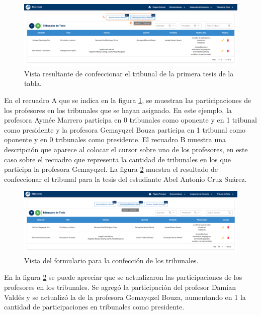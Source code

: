 \begin{figure}[H]
    \includegraphics[scale=0.3]{Graphics/Implementation/Tesis/thesis-committee-assign1.png}
    \caption{Vista resultante de confeccionar el tribunal de la primera tesis de la tabla.}
    \label{img-tc-thesis-committee-assign1}
\end{figure}

En el recuadro A que se indica en la figura \ref{img-tc-thesis-committee-assign1},
se muestran las participaciones de los profesores en los tribunales que se hayan asignado.
En este ejemplo, la profesora Aymée Marrero participa en 0 tribunales como oponente y en 1 tribunal
como presidente y la profesora Gemayqzel Bouza participa en 1 tribunal como oponente y en 0 tribunales 
como presidente.
El recuadro B muestra una descripción que aparece al colocar el cursor sobre uno de los profesores, en 
este caso sobre el recuadro que representa la cantidad de tribunales en los que participa la profesora Gemayqzel.
La figura \ref{img-tc-thesis-committee-assign2} muestra el resultado de confeccionar el tribunal para la tesis del estudiante Abel
Antonio Cruz Suárez.

\begin{figure}[H]
    \includegraphics[scale=0.3]{Graphics/Implementation/Tesis/thesis-committee-assign2.png}
    \caption{Vista del formulario para la confección de los tribunales.}
    \label{img-tc-thesis-committee-assign2}
\end{figure}

En la figura \ref{img-tc-thesis-committee-assign2}
se puede apreciar que se actualizaron las participaciones de los profesores en los tribunales.
Se agregó la participación del profesor Damian Valdés y se actualizó la de la profesora Gemayqzel Bouza, 
aumentando en 1 la cantidad de participaciones en tribunales como presidente.


